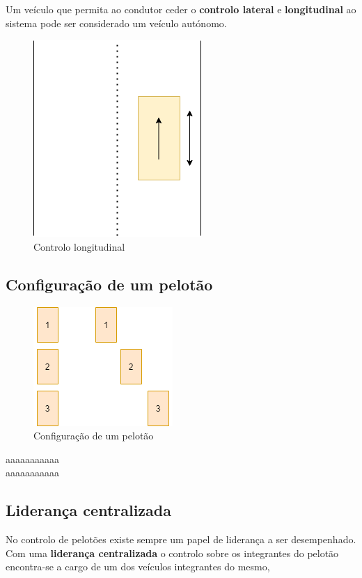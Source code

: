 Um veículo que permita ao condutor ceder o \textbf{controlo lateral} e \textbf{longitudinal} ao sistema pode ser considerado um veículo autónomo.
\begin{figure}[H]
    \centering
    \includegraphics[scale=0.4]{LEI - Article/Images/distLong.png}
    \caption{Controlo longitudinal}
    \label{fig:my_label}
\end{figure}

\subsection{Configuração de um pelotão}
\begin{figure}[H]
    \centering
    \includegraphics[scale=0.4]{LEI - Article/Images/configPlat.png}
    \caption{Configuração de um pelotão}
    \label{fig:my_label}
\end{figure}
aaaaaaaaaaa\\aaaaaaaaaaa

\subsection{Liderança centralizada}
No controlo de pelotões existe sempre um papel de liderança a ser desempenhado. Com uma \textbf{liderança centralizada} o controlo sobre os integrantes do pelotão encontra-se a cargo de um dos veículos integrantes do mesmo,

